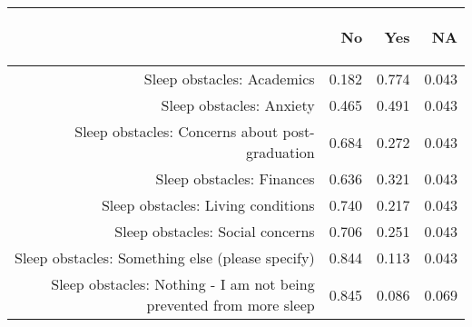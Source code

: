 \documentclass{article}\usepackage[]{graphicx}\usepackage[]{color}
\begin{document}
\begin{table}[ht]
\centering
\begin{tabular}{rrrr}
  \hline
 & \begin{sideways} No  \end{sideways} & \begin{sideways} Yes  \end{sideways} & \begin{sideways} NA  \end{sideways} \\ 
  \hline
Sleep obstacles: Academics & 0.182 & 0.774 & 0.043 \\ 
  Sleep obstacles: Anxiety & 0.465 & 0.491 & 0.043 \\ 
  Sleep obstacles: Concerns about post-graduation & 0.684 & 0.272 & 0.043 \\ 
  Sleep obstacles: Finances & 0.636 & 0.321 & 0.043 \\ 
  Sleep obstacles: Living conditions & 0.740 & 0.217 & 0.043 \\ 
  Sleep obstacles: Social concerns & 0.706 & 0.251 & 0.043 \\ 
  Sleep obstacles: Something else (please specify) & 0.844 & 0.113 & 0.043 \\ 
  Sleep obstacles: Nothing - I am not being prevented from more sleep & 0.845 & 0.086 & 0.069 \\ 
   \hline
\end{tabular}
\end{table}
\end{document}
